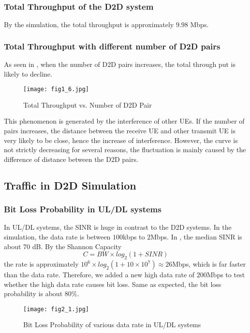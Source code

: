 \documentclass[conference]{IEEEtran}
\begin{document}
\subsubsection{Total Throughput of the D2D system}
By the simulation, the total throughput is approximately $9.98$ Mbps.
\subsubsection{Total Throughput with different number of D2D pairs}
As seen in , when the number of D2D pairs increases, the total through put is likely to decline.

\begin{figure}[htbp]
    \centering
    \texttt{[image: fig1\_6.jpg]}
    \caption{Total Throughput vs. Number of D2D Pair}
    \label{fig:d2d_num}
\end{figure}
 This phenomenon is generated by the interference of other UEs. If the number of pairs increases, the distance between the receive UE and other transmit UE is very likely to be close, hence the increase of interference. However, the curve is not strictly decreasing for several reasons, the fluctuation is mainly caused by the difference of distance between the D2D pairs.
\subsection{Traffic in D2D Simulation}

\subsubsection{Bit Loss Probability in UL/DL systems}
In UL/DL systems, the SINR is huge in contrast to the D2D systems. In the simulation, the data rate is between $100$kbps to $2$Mbps. In , the median SINR is about 70 dB. By the Shannon Capacity
\begin{equation} \label{eqn:shannon}
    C = BW \times log_2(1 + SINR)
\end{equation}
the rate is approximately $10^6 \times log_2(1+ 10 \times 10^7) \approx 26$Mbps, which is far faster than the data rate. Therefore, we added a new high data rate of $200$Mbps to test whether the high data rate causes bit loss. Same as expected, the bit loss probability is about $80\%$.
\begin{figure}[htbp]
    \centering
    \texttt{[image: fig2\_1.jpg]}
    \caption{Bit Loss Probability of various data rate in UL/DL systems}
    \label{fig:bit_uldl}
\end{figure}
\end{document}
